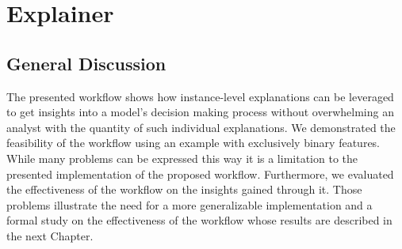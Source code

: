 \chapter{Explainer}
\label{chap:explainer}


\section{General Discussion}
The presented workflow \cite{explainer} shows how instance-level explanations can be leveraged to get insights into a model's decision making process without overwhelming an analyst with the quantity of such individual explanations.
We demonstrated the feasibility of the workflow using an example with exclusively binary features.
While many problems can be expressed this way it is a limitation to the presented implementation of the proposed workflow.
Furthermore, we evaluated the effectiveness of the workflow on the insights gained through it.
Those problems illustrate the need for a more generalizable implementation and a formal study on the effectiveness of the workflow whose results are described in the next Chapter.


